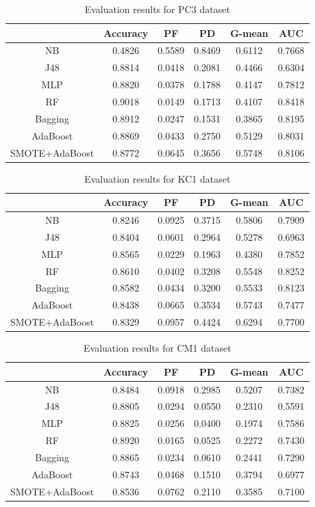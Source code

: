 \documentclass[runningheads,a4paper]{llncs}
\begin{document}
\begin{table}[httb]
\caption{Evaluation results for PC3 dataset}
\begin{centering}
\begin{tabular}{|c|c|c|c|c|c|}
\hline 
 & Accuracy & PF & PD & G-mean & AUC\tabularnewline
\hline 
\hline 
NB & 0.4826 & 0.5589 & 0.8469 & 0.6112 & 0.7668\tabularnewline
\hline 
J48 & 0.8814 & 0.0418 & 0.2081 & 0.4466 & 0.6304\tabularnewline
\hline 
MLP & 0.8820 & 0.0378 & 0.1788 & 0.4147 & 0.7812\tabularnewline
\hline 
RF & 0.9018 & 0.0149 & 0.1713 & 0.4107 & 0.8418\tabularnewline
\hline 
Bagging & 0.8912 & 0.0247 & 0.1531 & 0.3865 & 0.8195\tabularnewline
\hline 
AdaBoost & 0.8869 & 0.0433 & 0.2750 & 0.5129 & 0.8031\tabularnewline
\hline 
SMOTE+AdaBoost & 0.8772 & 0.0645 & 0.3656 & 0.5748 & 0.8106\tabularnewline
\hline 
\end{tabular}
\par\end{centering}
\label{table:PC3results}
\end{table}


\begin{table}[httb]
\caption{Evaluation results for KC1 dataset}
\begin{centering}
\begin{tabular}{|c|c|c|c|c|c|}
\hline 
 & Accuracy & PF & PD & G-mean & AUC\tabularnewline
\hline 
\hline 
NB & 0.8246 & 0.0925 & 0.3715 & 0.5806 & 0.7909\tabularnewline
\hline 
J48 & 0.8404 & 0.0601 & 0.2964 & 0.5278 & 0.6963\tabularnewline
\hline 
MLP & 0.8565 & 0.0229 & 0.1963 & 0.4380 & 0.7852\tabularnewline
\hline 
RF & 0.8610 & 0.0402 & 0.3208 & 0.5548 & 0.8252\tabularnewline
\hline 
Bagging & 0.8582 & 0.0434 & 0.3200 & 0.5533 & 0.8123\tabularnewline
\hline 
AdaBoost & 0.8438 & 0.0665 & 0.3534 & 0.5743 & 0.7477\tabularnewline
\hline 
SMOTE+AdaBoost & 0.8329 & 0.0957 & 0.4424 & 0.6294 & 0.7700\tabularnewline
\hline 
\end{tabular}
\par\end{centering}
\label{table:KC1results}
\end{table}


\begin{table}[httb]
\caption{Evaluation results for CM1 dataset}
\begin{centering}
\begin{tabular}{|c|c|c|c|c|c|}
\hline 
 & Accuracy & PF & PD & G-mean & AUC\tabularnewline
\hline 
\hline 
NB & 0.8484 & 0.0918 & 0.2985 & 0.5207 & 0.7382\tabularnewline
\hline 
J48 & 0.8805 & 0.0294 & 0.0550 & 0.2310 & 0.5591\tabularnewline
\hline 
MLP & 0.8825 & 0.0256 & 0.0400 & 0.1974 & 0.7586\tabularnewline
\hline 
RF & 0.8920 & 0.0165 & 0.0525 & 0.2272 & 0.7430\tabularnewline
\hline 
Bagging & 0.8865 & 0.0234 & 0.0610 & 0.2441 & 0.7290\tabularnewline
\hline 
AdaBoost & 0.8743 & 0.0468 & 0.1510 & 0.3794 & 0.6977\tabularnewline
\hline 
SMOTE+AdaBoost & 0.8536 & 0.0762 & 0.2110 & 0.3585 & 0.7100\tabularnewline
\hline 
\end{tabular}
\par\end{centering}
\label{table:CM1results}
\end{table}
\end{document}
